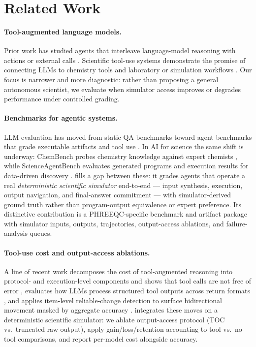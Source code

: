 \documentclass{article}
\begin{document}
\section{Related Work}

\paragraph{Tool-augmented language models.}
Prior work has studied agents that interleave language-model reasoning with actions or external calls \citep{yao2023react,schick2023toolformer}. Scientific tool-use systems demonstrate the promise of connecting LLMs to chemistry tools and laboratory or simulation workflows \citep{bran2024chemcrow,boiko2023autonomous}. Our focus is narrower and more diagnostic: rather than proposing a general autonomous scientist, we evaluate when simulator access improves or degrades performance under controlled grading.

\paragraph{Benchmarks for agentic systems.}
LLM evaluation has moved from static QA benchmarks toward agent benchmarks that grade executable artifacts and tool use \citep{rein2023gpqa,jimenez2024swebench}. In AI for science the same shift is underway: ChemBench probes chemistry knowledge against expert chemists \citep{mirza2025chembench}, while ScienceAgentBench evaluates generated programs and execution results for data-driven discovery \citep{chen2025scienceagentbench}. \BenchName{} fills a gap between these: it grades agents that operate a real \emph{deterministic scientific simulator} end-to-end --- input synthesis, execution, output navigation, and final-answer commitment --- with simulator-derived ground truth rather than program-output equivalence or expert preference. Its distinctive contribution is a PHREEQC-specific benchmark and artifact package with simulator inputs, outputs, trajectories, output-access ablations, and failure-analysis queues.

\paragraph{Tool-use cost and output-access ablations.}
A line of recent work decomposes the cost of tool-augmented reasoning into protocol- and execution-level components and shows that tool calls are not free of error \citep{toolusetax2026}, evaluates how LLMs process structured tool outputs across return formats \citep{toolouts2025}, and applies item-level reliable-change detection to surface bidirectional movement masked by aggregate accuracy \citep{rci2026}. \BenchName{} integrates these moves on a deterministic scientific simulator: we ablate output-access protocol (TOC vs.\ truncated raw output), apply gain/loss/retention accounting to tool vs.\ no-tool comparisons, and report per-model cost alongside accuracy.
\end{document}
